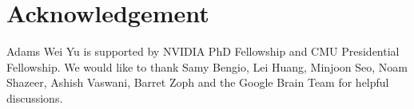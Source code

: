 \documentclass{article} \usepackage{iclr2018_conference,times}
\begin{document}
 \section*{Acknowledgement}
Adams Wei Yu is supported by NVIDIA PhD Fellowship and CMU Presidential Fellowship. We would like to thank Samy Bengio, Lei Huang, Minjoon Seo, Noam Shazeer, Ashish Vaswani, Barret Zoph and the Google Brain Team for helpful discussions.





\end{document}
